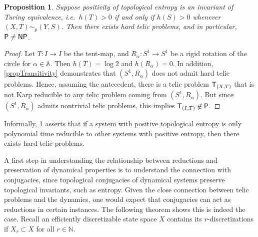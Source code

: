 \documentclass{amsart}
\theoremstyle{theorem}
\newtheorem{proposition}[theorem]{Proposition}
\theoremstyle{remark}
\numberwithin{equation}{section}
\renewcommand{\AA}{\mathbb{A}}
\newcommand{\NN}{\mathbb{N}}
\newcommand{\ccP}{\textsf{\upshape P}}
\newcommand{\ccNP}{\textsf{\upshape NP}}
\newcommand{\ccT}{\textsf{\upshape T}}
\begin{document}
\begin{proposition}\label{propReductionEntropy}
Suppose positivity of topological entropy is an invariant of Turing equivalence, i.e.\ $h(T)>0$ if and only if $h(S)>0$ whenever $(X, T) \sim_p (Y, S)$. Then there exists hard telic problems, and in particular, $\ccP\neq \ccNP$.
\end{proposition}
\begin{proof}
Let $T:I\rightarrow I$ be the tent-map, and $R_\alpha:S^1 \rightarrow S^1$ be a rigid rotation of the circle for $\alpha \in \AA$. Then $h(T) = \log2$ and $h(R_{\alpha}) = 0$. In addition, \cref{propTransitivity} demonstrates that $(S^1, R_\alpha)$ does not admit hard telic problems. Hence, assuming the antecedent, there is a telic problem $\ccT_{(X, T)}$ that is not Karp reducible to any telic problem coming from $(S^1, R_\alpha)$. But since $(S^1, R_\alpha)$ admits nontrivial telic problems, this implies $\ccT_{(I, T)} \not\in \ccP$.
\end{proof}

Informally, \cref{propReductionEntropy} asserts that if a system with positive topological entropy is only polynomial time reducible to other systems with positive entropy, then there exists hard telic problems.

A first step in understanding the relationship between reductions and preservation of dynamical properties is to understand the connection with conjugacies, since topological conjugacies of dynamical systems preserve topological invariants, such as entropy.
Given the close connection between telic problems and the dynamics, one would expect that conjugacies can act as reductions in certain instances. The following theorem shows this is indeed the case. Recall an efficiently discretizable state space $X$ contains its $r$-discretizations if $X_r \subset X$ for all $r \in \NN$.
\end{document}
